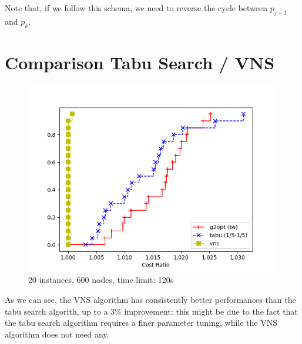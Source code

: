 \begin{figure}[h]
\end{figure}

Note that, if we follow this schema, we need to reverse the cycle between $p_{j+1}$ and $p_k$.

\newpage

\section{Comparison Tabu Search / VNS}

\FloatBarrier
\begin{figure}[h]
    \centering
    \includegraphics*[width=.6\textwidth]{../plots/perfprof_met_costs_result.png}
    \caption*{20 instances, 600 nodes, time limit: 120s}
\end{figure}

As we can see, the VNS algorithm has consistently better performances than the tabu search algorith, up to a 3\% improvement: this might be due to the fact that the tabu search algorithm requires a finer parameter tuning, while the VNS algorithm does not need any.